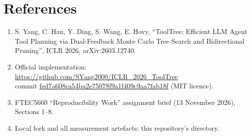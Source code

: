 \documentclass[11pt,letterpaper]{article}
\newcommand{\code}[1]{\texttt{\detokenize{#1}}}
\newcommand{\lcode}[1]{\url{#1}}
\begin{document}
\section*{References}

\begin{enumerate}
\small
\item S. Yang, C. Han, Y. Ding, S. Wang, E. Hovy, ``ToolTree: Efficient LLM Agent
Tool Planning via Dual-Feedback Monte Carlo Tree Search and Bidirectional
Pruning'', ICLR 2026, arXiv:2603.12740.
\item Official implementation:\\
\url{https://github.com/SYang2000/ICLR_2026_ToolTree}\\
commit \lcode{fed7a608ca54ba2e75078f9a1f409c9aa7fab18f} (MIT licence).
\item FTEC5660 ``Reproducibility Work'' assignment brief (13 November 2026),
Sections 1--8.
\item Local fork and all measurement artefacts: this repository's
\code{repro/} directory.
\end{enumerate}
\end{document}
